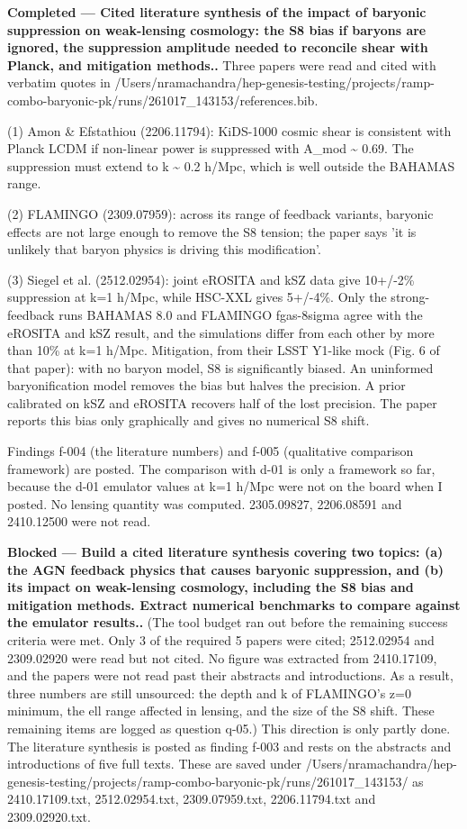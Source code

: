 \documentclass[11pt,a4paper]{article}
\begin{document}
\textbf{Completed --- Cited literature synthesis of the impact of baryonic suppression on weak-lensing cosmology: the S8 bias if baryons are ignored, the suppression amplitude needed to reconcile shear with Planck, and mitigation methods..} Three papers were read and cited with verbatim quotes in /Users/nramachandra/hep-genesis-testing/projects/ramp-combo-baryonic-pk/runs/261017\_143153/references.bib.

(1) Amon \& Efstathiou (2206.11794): KiDS-1000 cosmic shear is consistent with Planck LCDM if non-linear power is suppressed with A\_mod \textasciitilde{} 0.69. The suppression must extend to k \textasciitilde{} 0.2 h/Mpc, which is well outside the BAHAMAS range.

(2) FLAMINGO (2309.07959): across its range of feedback variants, baryonic effects are not large enough to remove the S8 tension; the paper says 'it is unlikely that baryon physics is driving this modification'.

(3) Siegel et al. (2512.02954): joint eROSITA and kSZ data give 10+/-2\% suppression at k=1 h/Mpc, while HSC-XXL gives 5+/-4\%. Only the strong-feedback runs BAHAMAS 8.0 and FLAMINGO fgas-8sigma agree with the eROSITA and kSZ result, and the simulations differ from each other by more than 10\% at k=1 h/Mpc. Mitigation, from their LSST Y1-like mock (Fig. 6 of that paper): with no baryon model, S8 is significantly biased. An uninformed baryonification model removes the bias but halves the precision. A prior calibrated on kSZ and eROSITA recovers half of the lost precision. The paper reports this bias only graphically and gives no numerical S8 shift.

Findings f-004 (the literature numbers) and f-005 (qualitative comparison framework) are posted. The comparison with d-01 is only a framework so far, because the d-01 emulator values at k=1 h/Mpc were not on the board when I posted. No lensing quantity was computed. 2305.09827, 2206.08591 and 2410.12500 were not read.

\textbf{Blocked --- Build a cited literature synthesis covering two topics: (a) the AGN feedback physics that causes baryonic suppression, and (b) its impact on weak-lensing cosmology, including the S8 bias and mitigation methods. Extract numerical benchmarks to compare against the emulator results..} (The tool budget ran out before the remaining success criteria were met. Only 3 of the required 5 papers were cited; 2512.02954 and 2309.02920 were read but not cited. No figure was extracted from 2410.17109, and the papers were not read past their abstracts and introductions. As a result, three numbers are still unsourced: the depth and k of FLAMINGO's z=0 minimum, the ell range affected in lensing, and the size of the S8 shift. These remaining items are logged as question q-05.) This direction is only partly done. The literature synthesis is posted as finding f-003 and rests on the abstracts and introductions of five full texts. These are saved under /Users/nramachandra/hep-genesis-testing/projects/ramp-combo-baryonic-pk/runs/261017\_143153/ as 2410.17109.txt, 2512.02954.txt, 2309.07959.txt, 2206.11794.txt and 2309.02920.txt.
\end{document}
